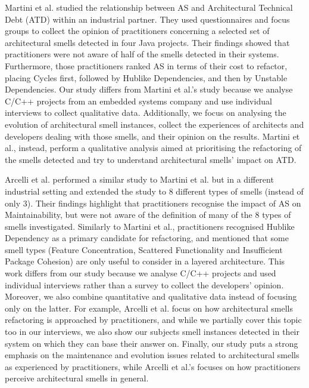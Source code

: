 Martini et al. \cite{Martini2018} studied the relationship between AS and Architectural Technical Debt (ATD) within an industrial partner. 
They used questionnaires and focus groups to collect the opinion of practitioners concerning a selected set of architectural smells detected in four Java projects.
Their findings showed that practitioners were not aware of half of the smells detected in their systems. Furthermore, those practitioners ranked AS in terms of their cost to refactor, placing Cycles first, followed by Hublike Dependencies, and then by Unstable Dependencies.
Our study differs from Martini et al.'s study because we analyse C/C++ projects from an embedded systems company and use individual interviews to collect qualitative data.
Additionally, we focus on analysing the evolution of architectural smell instances, collect the experiences of architects and developers dealing with those smells, and their opinion on the results.
Martini et al., instead, perform a qualitative analysis aimed at prioritising the refactoring of the smells detected and try to understand architectural smells' impact on ATD.

Arcelli et al. \cite{Arcelli2020} performed a similar study to Martini et al. but in a different industrial setting and extended the study to 8 different types of smells (instead of only 3).
Their findings highlight that practitioners recognise the impact of AS on Maintainability, but were not aware of the definition of many of the 8 types of smells investigated.
Similarly to Martini et al., practitioners recognised Hublike Dependency as a primary candidate for refactoring, and mentioned that some smell types (Feature Concentration, Scattered Functionality and Insufficient Package Cohesion) are only useful to consider in a layered architecture.
This work differs from our study because we analyse C/C++ projects and used individual interviews rather than a survey to collect the developers' opinion. Moreover, we also combine quantitative and qualitative data instead of focusing only on the latter. 
For example, Arcelli et al. focus on how architectural smells refactoring is approached by practitioners, and while we partially cover this topic too in our interviews, we also show our subjects smell instances detected in their system on which they can base their answer on.
Finally, our study puts a strong emphasis on the maintenance and evolution issues related to architectural smells as experienced by practitioners, while Arcelli et al.'s focuses on how practitioners perceive architectural smells in general. 

